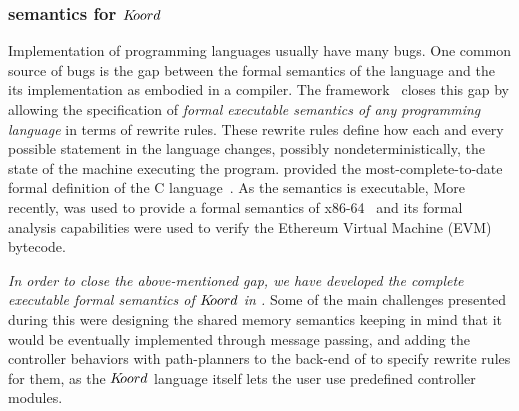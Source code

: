 %


\subsubsection{\K semantics for $K\kern-2pt oord$}
Implementation of programming languages usually have many bugs. One common source of bugs is the gap between the formal semantics of the language and the its implementation as embodied in a compiler. The \K framework~\cite{Kf} closes this gap by allowing the specification of {\em  formal executable semantics of any programming language} in terms of  rewrite rules. These rewrite rules define how each and every possible statement in the  language changes, possibly nondeterministically, the state of the machine executing the program. 
%
\K  provided the most-complete-to-date formal definition of the C language~\cite{KC}. As the \K semantics is executable,  More recently, \K  was used to provide a formal semantics of x86-64~\cite{rusuadvepaper} and its formal analysis capabilities were used to verify the Ethereum Virtual Machine (EVM) bytecode. 


{\em In order to close the above-mentioned gap, we have developed the complete executable formal semantics of $K\kern-2pt oord$ in \K.} 
Some of the main challenges presented during this were designing the shared memory semantics keeping in mind that it would be eventually implemented through message passing, and adding the controller behaviors with path-planners to the back-end of \K to specify rewrite rules for them, as the $K\kern-2pt oord$ language itself lets the user use predefined controller modules. 

